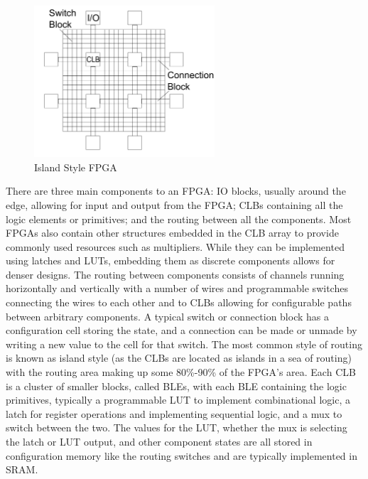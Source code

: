 \documentclass[12pt,final,oneside]{dwThesis} %
\begin{document}
   \begin{figure}
      \begin{center}
         \includegraphics[width=0.6\textwidth]{images/ArchFull.pdf}
         \caption{Island Style FPGA}
         \label{FPGAArch}
      \end{center}
   \end{figure}

   There are three main components to an \gls{FPGA}: \gls{IO} blocks, usually around the edge, allowing for input and output from the \gls{FPGA}; \glspl{CLB} containing all the logic elements or \glspl{primitive}; and the routing between all the components.
   Most \glspl{FPGA} also contain other structures embedded in the \gls{CLB} array to provide commonly used resources such as multipliers. While they can be implemented using latches and \glspl{LUT}, embedding them as discrete components allows for denser designs.
   The routing between components consists of channels running horizontally and vertically with a number of wires and programmable switches connecting the wires to each other and to \glspl{CLB} allowing for configurable paths between arbitrary components. A typical switch or connection block has a configuration cell storing the state, and a connection can be made or unmade by writing a new value to the cell for that switch. The most common style of routing is known as island style (as the \glspl{CLB} are located as islands in a sea of routing) with the routing area making up some 80\%-90\% of the \gls{FPGA}'s area\cite{FPGAArch}.
   Each \gls{CLB} is a cluster of smaller blocks, called \glspl{BLE}, with each \gls{BLE} containing the logic primitives, typically a programmable \gls{LUT} to implement combinational logic, a latch for register operations and implementing sequential logic, and a \gls{mux} to switch between the two. The values for the \gls{LUT}, whether the \gls{mux} is selecting the latch or \gls{LUT} output, and other component states are all stored in configuration memory like the routing switches and are typically implemented in \gls{SRAM}.
\end{document}
